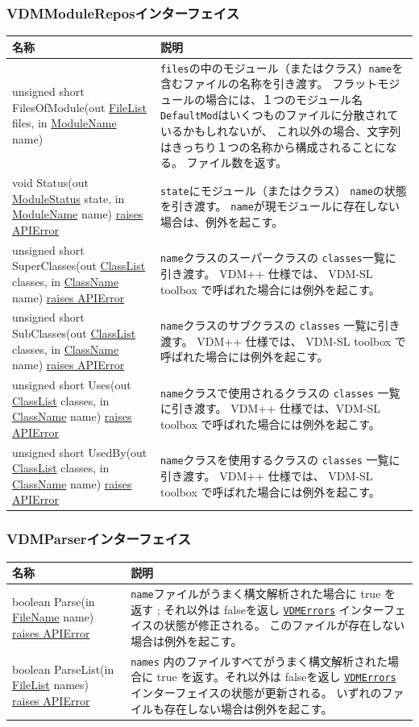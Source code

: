 \documentclass[\pformat,12pt]{jarticle}
\newcommand{\vdmsl}{VDM-SL }
\newcommand{\vdmpp}{VDM++ }
\newcommand{\pbs}[1]{\let\temp=\\#1\let\\=\temp}
\newenvironment{interfacetable}{%
  \begin{longtable}{|>{\pbs\raggedright\ttfamily}p{6.6cm}%
                    |>{\pbs\raggedright}p{6.6cm}|} \hline
  \textrm{\bfseries 名称} &  \textbf{説明} \\ \hline
  \endhead
  }{\end{longtable}}
\newcommand{\APIError}{\hyperlink{exception.APIError}{raises APIError}}
\newcommand{\ModuleName}{\hyperlink{type.ModuleName}{ModuleName}}
\newcommand{\ClassName}{\hyperlink{type.ClassName}{ClassName}}
\newcommand{\ClassList}{\hyperlink{type.ClassList}{ClassList}}
\newcommand{\FileName}{\hyperlink{type.FileName}{FileName}}
\newcommand{\FileList}{\hyperlink{type.FileList}{FileList}}
\newcommand{\ModuleStatus}{\hyperlink{struct.ModuleStatus}{ModuleStatus}}
\newcommand{\VDMErrors}{\hyperlink{interface.VDMErrors}{VDMErrors}}
\begin{document}
\subsubsection{VDMModuleReposインターフェイス}
\mbox{}
\begin{interfacetable}
unsigned short FilesOfModule(out {\FileList} files, in {\ModuleName} name)
 & \texttt{files}の中のモジュール（またはクラス）\texttt{name}を含むファイルの名称を引き渡す。
   フラットモジュールの場合には、１つのモジュール名 \texttt{DefaultMod}はいくつものファイルに分散されているかもしれないが、
これ以外の場合、文字列はきっちり１つの名称から構成されることになる。
   ファイル数を返す。
\\ \hline
void Status(out {\ModuleStatus} state, in {\ModuleName} name) \APIError
 & \texttt{state}にモジュール（またはクラス） \texttt{name}の状態を引き渡す。
 \texttt{name}が現モジュールに存在しない場合は、例外を起こす。
\\ \hline
unsigned short SuperClasses(out {\ClassList} classes, in {\ClassName} name)
 \APIError 
 &  \texttt{name}クラスのスーパークラスの \texttt{classes}一覧に引き渡す。
    \vdmpp 仕様では、 \vdmsl toolbox で呼ばれた場合には例外を起こす。
\\ \hline
unsigned short SubClasses(out {\ClassList} classes, in {\ClassName} name)
 \APIError
 & \texttt{name}クラスのサブクラスの \texttt{classes} 一覧に引き渡す。
   \vdmpp 仕様では、 \vdmsl toolbox で呼ばれた場合には例外を起こす。
\\ \hline
unsigned short Uses(out {\ClassList} classes, in {\ClassName} name)
 \APIError
 & \texttt{name}クラスで使用されるクラスの \texttt{classes} 一覧に引き渡す。
   \vdmpp 仕様では、\vdmsl toolbox で呼ばれた場合には例外を起こす。
\\ \hline
unsigned short UsedBy(out {\ClassList} classes, in {\ClassName} name)
 \APIError
 & \texttt{name}クラスを使用するクラスの \texttt{classes} 一覧に引き渡す。
   \vdmpp 仕様では、 \vdmsl toolbox で呼ばれた場合には例外を起こす。
\\ \hline
\end{interfacetable}

\subsubsection{VDMParserインターフェイス}
\mbox{}
\begin{interfacetable}
boolean Parse(in {\FileName} name) \APIError
  &  \texttt{name}ファイルがうまく構文解析された場合に \textsf{true} を返す
    ; それ以外は \textsf{false}を返し
    \texttt{\VDMErrors} インターフェイスの状態が修正される。
    このファイルが存在しない場合は例外を起こす。
\\ \hline
boolean ParseList(in {\FileList} names) \APIError
  &  \texttt{names} 内のファイルすべてがうまく構文解析された場合に
     \textsf{true} を返す。それ以外は \textsf{false}を返し
    \texttt{\VDMErrors} インターフェイスの状態が更新される。 
    いずれのファイルも存在しない場合は例外を起こす。
\\ \hline
\end{interfacetable}
\end{document}
